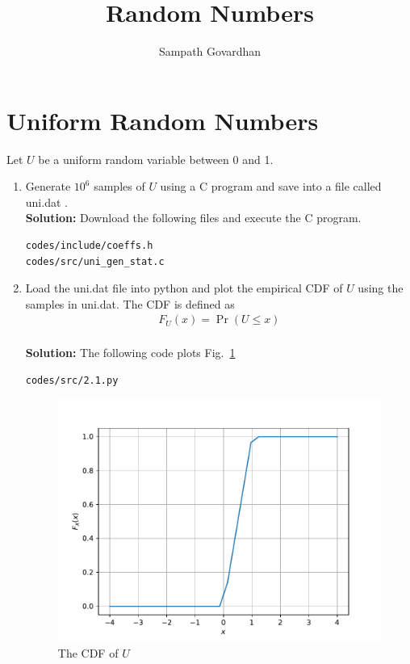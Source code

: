 \documentclass[journal,10pt,twocolumn]{article}
\newcommand\figref{Fig.~\ref}
\providecommand{\pr}[1]{\ensuremath{\Pr\left(#1\right)}}
\newcommand{\solution}{\noindent \textbf{Solution: }}
\begin{document}
\title{Random Numbers}
\author{Sampath Govardhan}

\maketitle

\tableofcontents

\bigskip

\fi

\section{Uniform Random Numbers}
Let $U$ be a uniform random variable between 0 and 1.
\begin{enumerate}
\item Generate $10^6$ samples of $U$ using a C program and save into a file called uni.dat .
\label{prob:uni_gen}
\\
\solution Download the following files and execute the  C program.
\begin{lstlisting}
codes/include/coeffs.h
codes/src/uni_gen_stat.c
\end{lstlisting}

%
\item
Load the uni.dat file into python and plot the empirical CDF of $U$ using the samples in uni.dat. The CDF is defined as
\begin{align}
F_{U}(x) = \pr{U \le x}
\end{align}
\\
\solution  The following code plots \figref{fig:uni_cdf}
\begin{lstlisting}
codes/src/2.1.py
\end{lstlisting}
\begin{figure}[h]
\centering
\includegraphics[width=\columnwidth]{./chapters/ch2/figs/uni_cdf.pdf}
\caption{The CDF of $U$}
\label{fig:uni_cdf}
\end{figure}


\end{enumerate}
\end{document}
